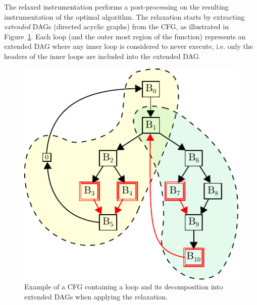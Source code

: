 \documentclass[sigplan,9pt]{acmart}
\begin{document}


The relaxed instrumentation performs a post-processing on the resulting instrumentation
of the optimal algorithm. 
The relaxation starts by extracting \textit{extended} DAGs (directed acyclic graphs)
from the CFG, as illustrated in Figure~\ref{fig:cfg-relax-example}.
Each loop (and the outer most region of the function) represents an extended DAG
where any inner loop is considered to never execute, i.e. only the headers of the
inner loops are included into the extended DAG.

%
%

\begin{figure}[h]
  \centering
  \includegraphics[scale=0.9]{figs/cfg-relax-example.pdf}
  \caption{Example of a CFG containing a loop and its decomposition into extended DAGs
           when applying the relaxation.}
  \label{fig:cfg-relax-example}
\end{figure}
\end{document}
